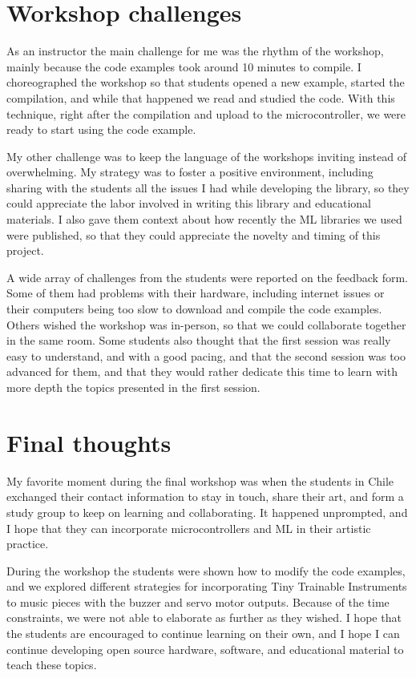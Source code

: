 \section{Workshop challenges}

As an instructor the main challenge for me was the rhythm of the workshop, mainly because the code examples took around 10 minutes to compile. I choreographed the workshop so that students opened a new example, started the compilation, and while that happened we read and studied the code. With this technique, right after the compilation and upload to the microcontroller, we were ready to start using the code example.

My other challenge was to keep the language of the workshops inviting instead of overwhelming. My strategy was to foster a positive environment, including sharing  with the students all the issues I had while developing the library, so they could appreciate the labor involved in writing this library and educational materials. I also gave them context about how recently the \acrshort{ML} libraries we used were published, so that they could appreciate the novelty and timing of this project.

A wide array of challenges from the students were reported on the feedback form. Some of them had problems with their hardware, including internet issues or their computers being too slow to download and compile the code examples. Others wished the workshop was in-person, so that we could collaborate together in the same room. Some students also thought that the first session was really easy to understand, and with a good pacing, and that the second session was too advanced for them, and that they would rather dedicate this time to learn with more depth the topics presented in the first session.

\section{Final thoughts}

My favorite moment during the final workshop was when the students in Chile exchanged their contact information to stay in touch, share their art, and form a study group to keep on learning and collaborating. It happened unprompted, and I hope that they can incorporate microcontrollers and \acrshort{ML} in their artistic practice.

During the workshop the students were shown how to modify the code examples, and we explored different strategies for incorporating Tiny Trainable Instruments to music pieces with the buzzer and servo motor outputs. Because of the time constraints, we were not able to elaborate as further as they wished. I hope that the students are encouraged to continue learning on their own, and I hope I can continue developing open source hardware, software, and educational material to teach these topics.
